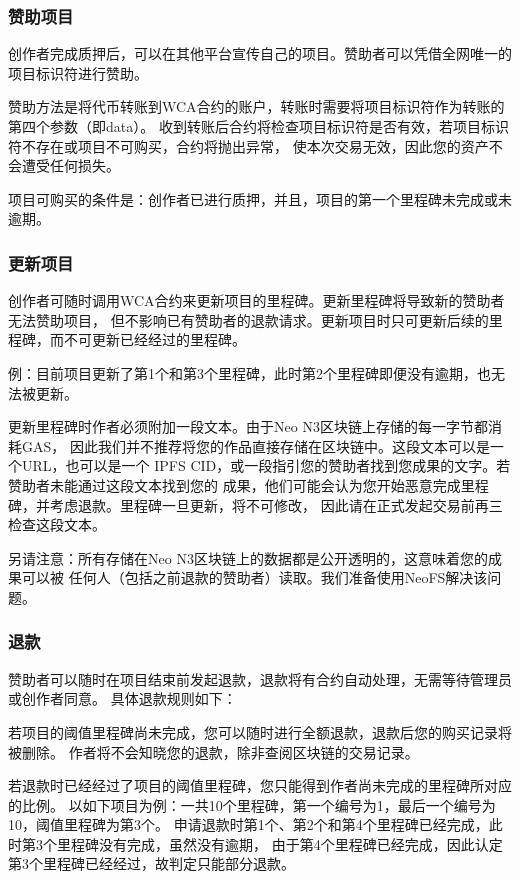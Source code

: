 \documentclass[11pt,UTF8,a4paper]{ctexart}
\begin{document}
    \subsubsection{赞助项目}

    创作者完成质押后，可以在其他平台宣传自己的项目。赞助者可以凭借全网唯一的项目标识符进行赞助。

    赞助方法是将代币转账到WCA合约的账户，转账时需要将项目标识符作为转账的第四个参数（即data）。
    收到转账后合约将检查项目标识符是否有效，若项目标识符不存在或项目不可购买，合约将抛出异常，
    使本次交易无效，因此您的资产不会遭受任何损失。

    项目可购买的条件是：创作者已进行质押，并且，项目的第一个里程碑未完成或未逾期。

    \subsubsection{更新项目}

    创作者可随时调用WCA合约来更新项目的里程碑。更新里程碑将导致新的赞助者无法赞助项目，
    但不影响已有赞助者的退款请求。更新项目时只可更新后续的里程碑，而不可更新已经经过的里程碑。

    例：目前项目更新了第1个和第3个里程碑，此时第2个里程碑即便没有逾期，也无法被更新。

    更新里程碑时作者必须附加一段文本。由于Neo N3区块链上存储的每一字节都消耗GAS，
    因此我们并不推荐将您的作品直接存储在区块链中。这段文本可以是一个URL，也可以是一个
    IPFS CID，或一段指引您的赞助者找到您成果的文字。若赞助者未能通过这段文本找到您的
    成果，他们可能会认为您开始恶意完成里程碑，并考虑退款。里程碑一旦更新，将不可修改，
    因此请在正式发起交易前再三检查这段文本。

    另请注意：所有存储在Neo N3区块链上的数据都是公开透明的，这意味着您的成果可以被
    任何人（包括之前退款的赞助者）读取。我们准备使用NeoFS解决该问题。

    \subsubsection{退款}

    赞助者可以随时在项目结束前发起退款，退款将有合约自动处理，无需等待管理员或创作者同意。
    具体退款规则如下：

    若项目的阈值里程碑尚未完成，您可以随时进行全额退款，退款后您的购买记录将被删除。
    作者将不会知晓您的退款，除非查阅区块链的交易记录。

    若退款时已经经过了项目的阈值里程碑，您只能得到作者尚未完成的里程碑所对应的比例。
    以如下项目为例：一共10个里程碑，第一个编号为1，最后一个编号为10，阈值里程碑为第3个。
    申请退款时第1个、第2个和第4个里程碑已经完成，此时第3个里程碑没有完成，虽然没有逾期，
    由于第4个里程碑已经完成，因此认定第3个里程碑已经经过，故判定只能部分退款。
\end{document}
